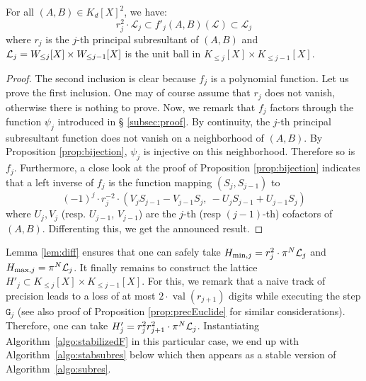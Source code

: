 \documentclass{article}
\DeclareMathOperator{\val}{val}
\begin{document}
\begin{lem}
\label{lem:diff}
For all $(A,B) \in K_d[X]^2$, we have:
$$r_j^2 \cdot \mathcal L_j 
\subset f'_j(A,B)(\mathcal L) \subset \mathcal L_j$$
where $r_j$ is the $j$-th principal subresultant of $(A,B)$ and
$\mathcal L_j = W_{\leq j}[X] \times W_{\leq j-1}[X]$ is the unit ball
in $K_{\leq j}[X] \times K_{\leq j-1}[X]$.
\end{lem}

\begin{proof}
The second inclusion is clear because $f_j$ is a polynomial function. 
Let us prove the first inclusion. One may of course assume that $r_j$ 
does not vanish, otherwise there is nothing to prove. Now, we remark 
that $f_j$ factors through the function $\psi_j$ introduced in \S 
\ref{subsec:proof}. By continuity, the $j$-th principal subresultant 
function does not vanish on a neighborhood of $(A,B)$. By Proposition 
\ref{prop:bijection}, $\psi_j$ is injective on this neighborhood. 
Therefore so is $f_j$. Furthermore, a close look at the proof of 
Proposition \ref{prop:bijection} indicates that a left inverse of $f_j$ 
is the function mapping $(S_j, S_{j-1})$ to
$$(-1)^j \cdot r_j^{-2} \cdot 
(V_j S_{j-1}{-}V_{j-1} S_j,\: -U_j S_{j-1}{+}U_{j-1} S_j)$$
where $U_j, V_j$ (resp. $U_{j-1}$, $V_{j-1}$) are the $j$-th (resp 
$(j-1)$-th) cofactors of $(A,B)$. Differenting this, we get the
announced result.
\end{proof}

Lemma \ref{lem:diff} ensures that one can safely take $H_{\text{\rm min},j} = 
r_j^2 \cdot \pi^N \mathcal L_j$ and $H_{\text{\rm max},j} = \pi^N \mathcal L_j$. It finally 
remains to construct the lattice $H'_j \subset K_{\leq j}[X] \times 
K_{\leq j-1}[X]$. For this, we remark that a naive track of precision 
leads to a loss of at most $2 \cdot \val(r_{j+1})$ digits while 
executing the step $\texttt{G}_j$ (see also proof of Proposition 
\ref{prop:precEuclide} for similar considerations). Therefore, one can 
take $H'_j = r_j^2 r_{j+1}^2 \cdot \pi^N \mathcal L_j$. Instantiating
Algorithm~\ref{algo:stabilizedF} in this particular case, we end up
with Algorithm~\ref{algo:stabsubres} below which then appears as a 
stable version of Algorithm~\ref{algo:subres}.
\end{document}
